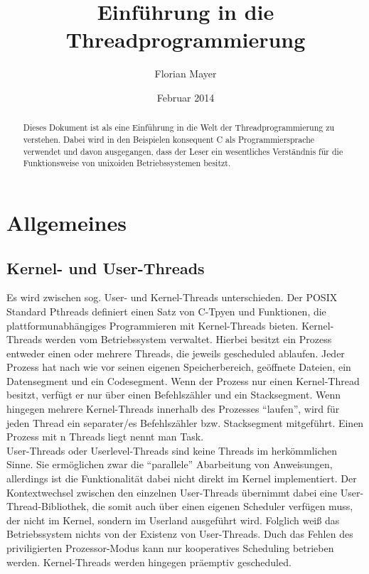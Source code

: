 \documentclass[11pt,a4paper]{article}
\begin{document}
\title{\color{black}Einführung in die Threadprogrammierung}
\author{\color{darkblue}Florian Mayer}
\date{\color{lightblue}Februar 2014}
\maketitle

\begin{abstract}
Dieses Dokument ist als eine Einführung in die Welt der Threadprogrammierung zu verstehen. Dabei wird in den Beispielen konsequent C als Programmiersprache verwendet und davon ausgegangen, dass der Leser ein wesentliches Verständnis für die Funktionsweise von unixoiden Betriebssystemen besitzt. 
\end{abstract}

\section{Allgemeines}
\subsection{Kernel- und User-Threads}
Es wird zwischen sog. User- und Kernel-Threads unterschieden. 
Der POSIX Standard Pthreads definiert einen Satz von C-Tpyen und Funktionen, die plattformunabhängiges Programmieren mit Kernel-Threads bieten. Kernel-Threads werden vom Betriebssystem verwaltet. Hierbei besitzt ein Prozess entweder einen oder mehrere Threads, die jeweils gescheduled ablaufen. Jeder Prozess hat nach wie vor seinen eigenen Speicherbereich, geöffnete Dateien, ein Datensegment und ein Codesegment. Wenn der Prozess nur einen Kernel-Thread besitzt, verfügt er nur über einen Befehlszähler und ein Stacksegment. Wenn hingegen mehrere Kernel-Threads innerhalb des Prozesses ``laufen'', wird für jeden Thread ein separater/es Befehlszähler bzw. Stacksegment mitgeführt. Einen Prozess mit n Threads liegt nennt man Task. \\ 
User-Threads oder Userlevel-Threads sind keine Threads im herkömmlichen Sinne. Sie ermöglichen zwar die ``parallele'' Abarbeitung von Anweisungen, allerdings ist die Funktionalität dabei nicht direkt im Kernel implementiert. Der Kontextwechsel zwischen den einzelnen User-Threads übernimmt dabei eine User-Thread-Bibliothek, die somit auch über einen eigenen Scheduler verfügen muss, der nicht im Kernel, sondern im Userland ausgeführt wird. Folglich weiß das Betriebssystem nichts von der Existenz von User-Threads. Duch das Fehlen des priviligierten Prozessor-Modus kann nur kooperatives Scheduling betrieben werden. Kernel-Threads werden hingegen präemptiv gescheduled.
\end{document}
